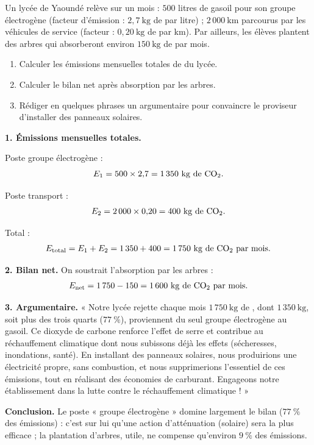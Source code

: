 \documentclass[11pt]{article}
\begin{document}
\begin{exoresolu}
Un lycée de Yaoundé relève sur un mois : $500$ litres de gasoil pour son groupe électrogène (facteur d'émission : $2{,}7\ \mathrm{kg}$ de  par litre) ; $2\,000\ \mathrm{km}$ parcourus par les véhicules de service (facteur : $0{,}20\ \mathrm{kg}$ de  par km). Par ailleurs, les élèves plantent des arbres qui absorberont environ $150\ \mathrm{kg}$ de  par mois.
\begin{enumerate}
\item Calculer les émissions mensuelles totales de  du lycée.
\item Calculer le bilan net après absorption par les arbres.
\item Rédiger en quelques phrases un argumentaire pour convaincre le proviseur d'installer des panneaux solaires.
\end{enumerate}
\tcblower
\textbf{1. Émissions mensuelles totales.}

Poste groupe électrogène :
\[ E_1 = 500 \times 2{,}7 = 1\,350\ \mathrm{kg\ de\ } \ce{CO2}. \]

Poste transport :
\[ E_2 = 2\,000 \times 0{,}20 = 400\ \mathrm{kg\ de\ } \ce{CO2}. \]

Total :
\[ E_{\text{total}} = E_1 + E_2 = 1\,350 + 400 = 1\,750\ \mathrm{kg\ de\ } \ce{CO2} \ \text{par mois}. \]

\textbf{2. Bilan net.} On soustrait l'absorption par les arbres :
\[ E_{\text{net}} = 1\,750 - 150 = 1\,600\ \mathrm{kg\ de\ } \ce{CO2} \ \text{par mois}. \]

\textbf{3. Argumentaire.} « Notre lycée rejette chaque mois $1\,750\ \mathrm{kg}$ de , dont $1\,350\ \mathrm{kg}$, soit plus des trois quarts ($77\ \%$), proviennent du seul groupe électrogène au gasoil. Ce dioxyde de carbone renforce l'effet de serre et contribue au réchauffement climatique dont nous subissons déjà les effets (sécheresses, inondations, santé). En installant des panneaux solaires, nous produirions une électricité propre, sans combustion, et nous supprimerions l'essentiel de ces émissions, tout en réalisant des économies de carburant. Engageons notre établissement dans la lutte contre le réchauffement climatique ! »

\textbf{Conclusion.} Le poste « groupe électrogène » domine largement le bilan ($77\ \%$ des émissions) : c'est sur lui qu'une action d'atténuation (solaire) sera la plus efficace ; la plantation d'arbres, utile, ne compense qu'environ $9\ \%$ des émissions.
\end{exoresolu}
\end{document}
